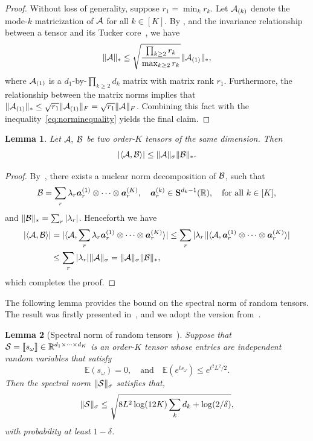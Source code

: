 \documentclass{article}
\theoremstyle{plain}
\newtheorem{lem}{Lemma}
\theoremstyle{definition}
\begin{document}
\begin{proof}
Without loss of generality, suppose $r_1=\min_k r_k$. Let $\mathcal{A}_{(k)}$ denote the mode-$k$ matricization of $\mathcal{A}$ for all $k\in[K]$. By \citet[Corollary 4.11]{wang2017operator}, and the invariance relationship between a tensor and its Tucker core~\citep[Section 6]{jiang2017tensor}, we have
\begin{equation}\label{eq:norminequality}
\lVert\mathcal{A}\rVert_* \leq \sqrt{\prod_{k\geq 2} r_k \over \max_{k\geq 2} r_k} \lVert\mathcal{A}_{(1)}\rVert_*,
\end{equation}
where $\mathcal{A}_{(1)}$ is a $d_1$-by-$\prod_{k\geq 2}d_k$ matrix with matrix rank $r_1$. Furthermore, the relationship between the matrix norms implies that $\lVert\mathcal{A}_{(1)}\rVert_*\leq \sqrt{r_1}\lVert\mathcal{A}_{(1)}\rVert_F=\sqrt{r_1}\lVert\mathcal{A}\rVert_F$. Combining this fact with the inequality~\eqref{eq:norminequality} yields the final claim.
\end{proof}



\begin{lem} \label{lem:inq}
Let $\mathcal{A}, \; \mathcal{B}$ be two order-$K$ tensors of the same dimension. Then
\[
|\langle \mathcal{A},\mathcal{B}\rangle| \leq \lVert\mathcal{A}\rVert_\sigma   \lVert\mathcal{B}\rVert_*.
\]
\end{lem}

\begin{proof}
By~\citet[Proposition 3.1]{friedland2018nuclear}, there exists a nuclear norm decomposition of $\mathcal{B}$, such that
\[
\mathcal{B}=\sum_{r} \lambda_r \bm{a}^{(1)}_r\otimes \cdots\otimes \bm{a}^{(K)}_r,\quad \bm{a}_r^{(k)}\in\mathbf{S}^{d_k-1}(\mathbb{R}),\quad \text{for all }k\in[K],
\]
and $\lVert\mathcal{B}\rVert_*=\sum_{r}|\lambda_r|$. Henceforth we have
\begin{align*}
|\langle \mathcal{A},\mathcal{B}\rangle|&=| \langle \mathcal{A}, \sum_{r} \lambda_r \bm{a}^{(1)}_r\otimes \cdots\otimes \bm{a}^{(K)}_r \rangle|\leq \sum_r |\lambda_r| |\langle \mathcal{A}, \bm{a}^{(1)}_r \otimes \cdots\otimes \bm{a}^{(K)}_r \rangle|\\
&\leq \sum_{r}|\lambda_r| \lVert\mathcal{A}\rVert_\sigma= \lVert\mathcal{A}\rVert_\sigma\lVert\mathcal{B}\rVert_*,
\end{align*}
which completes the proof.
\end{proof}


The following lemma provides the bound on the spectral norm of random tensors. The result was firstly presented in~\cite{nguyen2015tensor}, and we adopt the version from~\cite{tomioka2014spectral}.
\begin{lem}[Spectral norm of random tensors~\citep{tomioka2014spectral}]\label{lem:tensor}
Suppose that $\mathcal{S}=\llbracket s_{\omega} \rrbracket\in\mathbb{R}^{d_1\times \cdots \times d_K}$ is an order-$K$ tensor whose entries are independent random variables that satisfy
\[
\mathbb{E}(s_{\omega})=0,\quad \text{and} \quad\mathbb{E}(e^{ts_{\omega}})\leq e^{t^2L^2/2}.
\]
Then the spectral norm $\lVert\mathcal{S}\rVert_\sigma$ satisfies that,
\[
\lVert\mathcal{S}\rVert_\sigma\leq \sqrt{{8L^2} \log (12K) \sum_k d_k +\log (2/\delta)},
\]
with probability at least $1-\delta$.
\end{lem}
\end{document}
